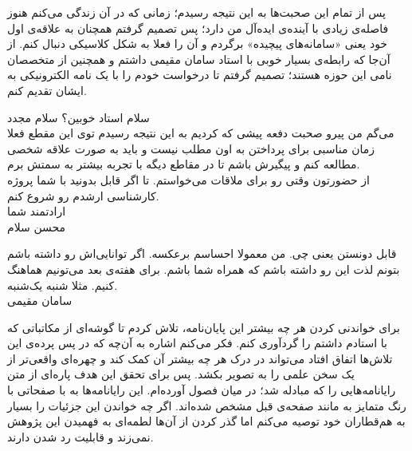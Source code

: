 پس از تمام این صحبت‌ها به این نتیجه رسیدم؛ زمانی که در آن زندگی می‌کنم هنوز فاصله‌ی زیادی با آینده‌ی ایده‌آل من دارد؛ پس تصمیم گرفتم همچنان به علاقه‌ی اول خود یعنی «سامانه‌های پیچیده» برگردم و آن را فعلا به شکل کلاسیکی دنبال کنم. از آن‌جا که رابطه‌ی بسیار خوبی با استاد سامان مقیمی داشتم و همچنین از متخصصان نامی این حوزه هستند؛ تصمیم گرفتم تا درخواست خودم را با یک نامه الکترونیکی به ایشان تقدیم کنم.
\begin{mohsenletter}

	سلام استاد خوبین؟ سلام مجدد\\
	می‌گم من پیرو صحبت دفعه پیشی که کردیم به این نتیجه رسیدم توی این مقطع فعلا زمان مناسبی برای پرداختن به اون مطلب نیست و باید به صورت علاقه شخصی مطالعه کنم و پیگیرش باشم تا در مقاطع دیگه با تجربه بیشتر به سمتش برم.\\
	
	از حضورتون وقتی رو برای ملاقات می‌خواستم. تا اگر قابل بدونید با شما پروژه کارشناسی ارشدم رو شروع کنم.\\
	
	ارادتمند شما\\
	محسن
	\medskip
	سلام
	
	قابل دونستن یعنی چی. من معمولا احساسم برعکسه. اگر توانایی‌اش رو داشته باشم بتونم لذت این رو داشته باشم که همراه شما باشم.
	برای هفته‌ی بعد می‌تونیم هماهنگ کنیم. مثلا شنبه یک‌شنبه.\\
	
	سامان مقیمی
\end{mohsenletter}


\newpage
{}
برای خواندنی کردن هر چه بیشتر این پایان‌نامه، تلاش کردم تا گوشه‌ای از مکاتباتی که با استادم داشتم را گردآوری کنم. فکر می‌کنم اشاره به آن‌چه که  در پس پرده‌ی این تلاش‌ها اتفاق افتاد می‌تواند در درک هر چه بیشتر آن کمک کند و چهره‌ای واقعی‌تر از یک سخن علمی را به تصویر بکشد. پس برای تحقق این هدف پاره‌ای از متن رایانامه‌هایی را که مبادله شد؛ در میان فصول آورده‌ام. این رایانامه‌ها به با صفحاتی با رنگ متمایز به مانند صفحه‌ی قبل مشخص شده‌اند. اگر چه خواندن این جزئیات را بسیار به هم‌قطاران خود توصیه می‌کنم اما گذر کردن از آن‌ها لطمه‌ای به فهمیدن این پژوهش نمی‌زند و قابلیت رد شدن دارند.
